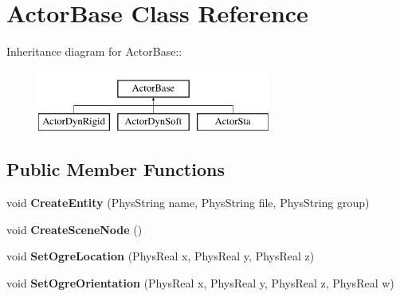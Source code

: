 \hypertarget{classActorBase}{
\section{ActorBase Class Reference}
\label{dd/d7b/classActorBase}
}
Inheritance diagram for ActorBase::\begin{figure}[H]
\begin{center}
\leavevmode
\includegraphics[height=2cm]{dd/d7b/classActorBase}
\end{center}
\end{figure}
\subsection*{Public Member Functions}
\begin{DoxyCompactItemize}
\item 
\hypertarget{classActorBase_aa87583c47b8653e8ac7d96f1481b57fd}{
void {\bfseries CreateEntity} (PhysString name, PhysString file, PhysString group)}
\label{dd/d7b/classActorBase_aa87583c47b8653e8ac7d96f1481b57fd}

\item 
\hypertarget{classActorBase_a168cd57e20b2adfc5cae21627ddbae31}{
void {\bfseries CreateSceneNode} ()}
\label{dd/d7b/classActorBase_a168cd57e20b2adfc5cae21627ddbae31}

\item 
\hypertarget{classActorBase_a624f83ed4265a32db6d816a882a5bebd}{
void {\bfseries SetOgreLocation} (PhysReal x, PhysReal y, PhysReal z)}
\label{dd/d7b/classActorBase_a624f83ed4265a32db6d816a882a5bebd}

\item 
\hypertarget{classActorBase_a64ec1d0987bb32070e0c686db3b06e56}{
void {\bfseries SetOgreOrientation} (PhysReal x, PhysReal y, PhysReal z, PhysReal w)}
\label{dd/d7b/classActorBase_a64ec1d0987bb32070e0c686db3b06e56}

\end{DoxyCompactItemize}
